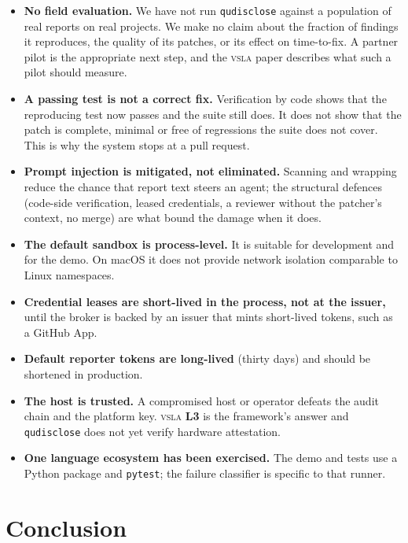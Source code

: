 \documentclass[11pt]{article}
\newcommand{\qud}{\texttt{qudisclose}}
\newcommand{\vsla}{\textsc{vsla}}
\newcommand{\lvl}[1]{\textbf{L#1}}
\newcommand{\code}[1]{\texttt{\small #1}}
\begin{document}
\begin{itemize}[leftmargin=1.4em, itemsep=0.3em]
  \item \textbf{No field evaluation.} We have not run \qud{} against a population of real reports on real
  projects. We make no claim about the fraction of findings it reproduces, the quality of its patches, or its
  effect on time-to-fix. A partner pilot is the appropriate next step, and the \vsla{} paper describes what
  such a pilot should measure.
  \item \textbf{A passing test is not a correct fix.} Verification by code shows that the reproducing test now
  passes and the suite still does. It does not show that the patch is complete, minimal or free of regressions
  the suite does not cover. This is why the system stops at a pull request.
  \item \textbf{Prompt injection is mitigated, not eliminated.} Scanning and wrapping reduce the chance that
  report text steers an agent; the structural defences (code-side verification, leased credentials, a reviewer
  without the patcher's context, no merge) are what bound the damage when it does.
  \item \textbf{The default sandbox is process-level.} It is suitable for development and for the demo. On
  macOS it does not provide network isolation comparable to Linux namespaces.
  \item \textbf{Credential leases are short-lived in the process, not at the issuer,} until the broker is backed
  by an issuer that mints short-lived tokens, such as a GitHub App.
  \item \textbf{Default reporter tokens are long-lived} (thirty days) and should be shortened in production.
  \item \textbf{The host is trusted.} A compromised host or operator defeats the audit chain and the platform
  key. \vsla{} \lvl{3} is the framework's answer and \qud{} does not yet verify hardware attestation.
  \item \textbf{One language ecosystem has been exercised.} The demo and tests use a Python package and
  \code{pytest}; the failure classifier is specific to that runner.
\end{itemize}

\section{Conclusion}
\end{document}
